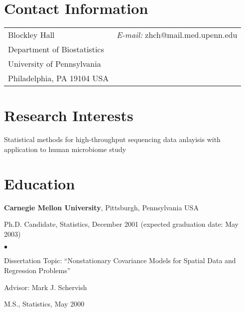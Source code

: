 \documentclass[margin,line]{res}
\newenvironment{list1}{
	\begin{list}{\ding{113}}{%
			\setlength{\itemsep}{0in}
			\setlength{\parsep}{0in} \setlength{\parskip}{0in}
			\setlength{\topsep}{0in} \setlength{\partopsep}{0in} 
			\setlength{\leftmargin}{0.17in}}}{\end{list}}
\newenvironment{list2}{
	\begin{list}{$\bullet$}{%
			\setlength{\itemsep}{0in}
			\setlength{\parsep}{0in} \setlength{\parskip}{0in}
			\setlength{\topsep}{0in} \setlength{\partopsep}{0in} 
			\setlength{\leftmargin}{0.2in}}}{\end{list}}
\begin{document}
	
	
	\begin{resume}
		\section{\sc Contact Information}
		\vspace{.05in}
		\begin{tabular}{@{}p{2in}p{4in}}
			Blockley Hall           &  {\it E-mail:}  zhch@mail.med.upenn.edu\\               
			Department of Biostatistics  \\         
			University of Pennsylvania  \\  
			Philadelphia, PA  19104 USA   \\     
		\end{tabular}
		
		
		\section{\sc Research Interests}
		Statistical methods for high-throughput sequencing data anlayisis with application to human microbiome study
		
		\section{\sc Education}
		{\bf Carnegie Mellon University}, Pittsburgh, Pennsylvania USA\\
		\vspace*{-.1in}
		\begin{list1}
			\item[] Ph.D. Candidate, Statistics, December 2001 (expected
			graduation date: May 2003)
			\begin{list2}
				\vspace*{.05in}
				\item Dissertation Topic:  ``Nonstationary Covariance Models for
				Spatial Data and Regression Problems'' 
				\item Advisor:  Mark J. Schervish
			\end{list2}
			\vspace*{.05in}
			\item[] M.S., Statistics,  May 2000
		\end{list1}
		

\end{resume}
\end{document}
